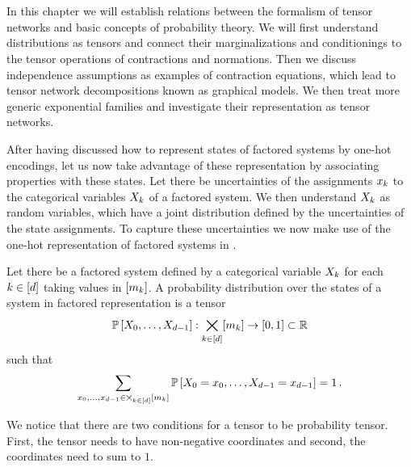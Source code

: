 \chapter{\chatextprobRepresentation}\label{cha:probRepresentation}

In this chapter we will establish relations between the formalism of tensor networks and basic concepts of probability theory.
We will first understand distributions as tensors and connect their marginalizations and conditionings to the tensor operations of contractions and normations.
Then we discuss independence assumptions as examples of contraction equations, which lead to tensor network decompositions known as graphical models.
We then treat more generic exponential families and investigate their representation as tensor networks.


After having discussed how to represent states of factored systems by one-hot encodings, let us now take advantage of these representation by associating properties with these states.
Let there be uncertainties of the assignments $x_{k}$ to the categorical variables $X_{k}$ of a factored system.
We then understand $X_{k}$ as random variables, which have a joint distribution defined by the uncertainties of the state assignments.
To capture these uncertainties we now make use of the one-hot representation of factored systems in .

\begin{definition} %
	Let there be a factored system defined by a categorical variable $X_{k}$ for each $k\in[d]$ taking values in $[m_{k}]$. 
	A probability distribution over the states of a system in factored representation is a tensor
		\[ \mathbb{P}\left[X_{0},\ldots,X_{d-1}\right] : \bigtimes_{k\in[d]}[m_{k}] \rightarrow [0, 1] \subset \mathbb{R} \]
	such that
		\[ \sum_{x_{0},\ldots,x_{d-1}\in\bigtimes_{k\in[d]}[m_{k}]} \mathbb{P}\left[X_{0}=x_{0},\ldots,X_{d-1}=x_{d-1}\right] = 1 \, . \]
\end{definition}

We notice that there are two conditions for a tensor to be probability tensor.
First, the tensor needs to have non-negative coordinates and second, the coordinates need to sum to $1$.

